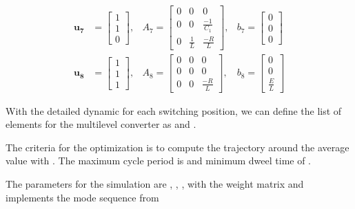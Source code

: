 \begin{equation}
\begin{matrix}
        \mathbf{u_7} &= \left[ \begin{array}{ccc} 1 \\ 1 \\ 0 \end{array} \right],
        &
        A_7 = \left[ \begin{array}{ccc} 
            0 & 0 & 0 \\
            0 & 0 & \frac{-1}{C_1} \\
            0 & \frac{1}{L} & \frac{-R}{L} 
        \end{array} \right],
        &
        b_7 = \left[ \begin{array}{c} 0 \\ 0 \\ 0 \end{array} \right] \\
        \mathbf{u_8} &= \left[ \begin{array}{ccc} 1 \\ 1 \\ 1 \end{array} \right],
        &
        A_8 = \left[ \begin{array}{ccc} 
            0 & 0 & 0 \\
            0 & 0 & 0 \\
            0 & 0 & \frac{-R}{L} 
        \end{array} \right],
        &
        b_8 = \left[ \begin{array}{c} 0 \\ 0 \\ \frac{E}{L} \end{array} \right]
    \end{matrix}
\end{equation}


With the detailed dynamic for each switching position, we can define the list of 
elements for the multilevel converter as  and 
 .


The criteria for the optimization is to compute the trajectory around the average value 
 with .
The maximum cycle period is  and minimum dweel time of 
. 

The parameters for the simulation are , 
, , 
 with the weight matrix 
and implements the mode sequence from 

